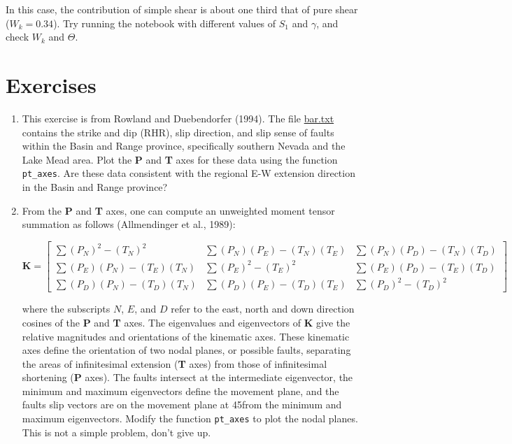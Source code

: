 \documentclass[a4paper , 12pt]{book}
\newcommand{\code}[1]{\colorbox{light-gray}{\texttt{#1}}}
\begin{document}
In this case, the contribution of simple shear is about one third that of pure shear ($W_k = 0.34$). Try running the notebook with different values of $S_1$ and $\gamma$, and check $W_k$ and $\Theta$.

\section{Exercises}

\begin{enumerate}
    \item This exercise is from Rowland and Duebendorfer (1994). The file \href{https://github.com/nfcd/compGeo/blob/master/source/data/ch8-exercise1/bar.txt}{bar.txt} contains the strike and dip (RHR), slip direction, and slip sense of faults within the Basin and Range province, specifically southern Nevada and the Lake Mead area. Plot the \textbf{P} and \textbf{T} axes for these data using the function \code{pt\_axes}. Are these data consistent with the regional E-W extension direction in the Basin and Range province?
    
    \item From the \textbf{P} and \textbf{T} axes, one can compute an unweighted moment tensor summation as follows (Allmendinger et al., 1989):
    
    \begin{equation*}
    \scriptstyle \mathbf{K} = \left[\begin{array}{ccc}\scriptstyle\sum (P_N)^{2} - (T_N)^{2}  & \scriptstyle\sum (P_N) (P_E) - (T_N) (T_E) & \scriptstyle\sum (P_N) (P_D) - (T_N) (T_D) \\ \scriptstyle\sum (P_E) (P_N) - (T_E) (T_N) & \scriptstyle\sum (P_E)^{2} - (T_E)^{2} & \scriptstyle\sum (P_E) (P_D) - (T_E) (T_D) \\ \scriptstyle\sum (P_D) (P_N) - (T_D) (T_N) & \scriptstyle\sum (P_D) (P_E) - (T_D) (T_E) & \scriptstyle\sum (P_D)^{2} - (T_D)^{2}\end{array}\right]
    \end{equation*}

    where the subscripts $N$, $E$, and $D$ refer to the east, north and down direction cosines of the \textbf{P} and \textbf{T} axes. The eigenvalues and eigenvectors of $\mathbf{K}$ give the relative magnitudes and orientations of the kinematic axes. These kinematic axes define the orientation of two nodal planes, or possible faults, separating the areas of infinitesimal extension (\textbf{T} axes) from those of infinitesimal shortening (\textbf{P} axes). The faults intersect at the intermediate eigenvector, the minimum and maximum eigenvectors define the movement plane, and the faults slip vectors are on the movement plane at 45\degree\space from the minimum and maximum eigenvectors. Modify the function \code{pt\_axes} to plot the nodal planes. This is not a simple problem, don't give up.
    

\end{enumerate}
\end{document}

